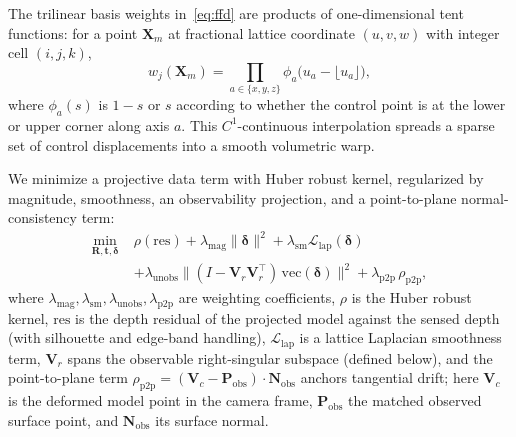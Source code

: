 \documentclass[9pt,twoside,web]{ieeecolor2}
\begin{document}
The trilinear basis weights in~\eqref{eq:ffd} are products of one-dimensional tent functions: for a point $\mathbf{X}_{m}$ at fractional lattice coordinate $(u,v,w)$ with integer cell $(i,j,k)$,
\begin{equation}\label{eq:trilinear}
w_{j}(\mathbf{X}_{m}) = \prod_{a\in\{x,y,z\}}\phi_{a}\!\bigl(u_{a}-\lfloor u_{a}\rfloor\bigr),
\end{equation}
where $\phi_{a}(s)$ is $1-s$ or $s$ according to whether the control point is at the lower or upper corner along axis $a$. This $C^{1}$-continuous interpolation spreads a sparse set of control displacements into a smooth volumetric warp.

We minimize a projective data term with Huber robust kernel, regularized by magnitude, smoothness, an observability projection, and a point-to-plane normal-consistency term:
\begin{equation}\label{eq:rtwobj}
\begin{aligned}
\min_{\mathbf{R},\mathbf{t},\boldsymbol{\delta}}\; & \rho\!\left(\mathrm{res}\right) + \lambda_{\mathrm{mag}}\|\boldsymbol{\delta}\|^{2} + \lambda_{\mathrm{sm}}\mathcal{L}_{\mathrm{lap}}(\boldsymbol{\delta}) \\
& + \lambda_{\mathrm{unobs}}\bigl\|(I-\mathbf{V}_{r}\mathbf{V}_{r}^{\top})\,\mathrm{vec}(\boldsymbol{\delta})\bigr\|^{2} + \lambda_{\mathrm{p2p}}\,\rho_{\mathrm{p2p}},
\end{aligned}
\end{equation}
where $\lambda_{\mathrm{mag}},\lambda_{\mathrm{sm}},\lambda_{\mathrm{unobs}},\lambda_{\mathrm{p2p}}$ are weighting coefficients, $\rho$ is the Huber robust kernel, $\mathrm{res}$ is the depth residual of the projected model against the sensed depth (with silhouette and edge-band handling), $\mathcal{L}_{\mathrm{lap}}$ is a lattice Laplacian smoothness term, $\mathbf{V}_{r}$ spans the observable right-singular subspace (defined below), and the point-to-plane term $\rho_{\mathrm{p2p}}=(\mathbf{V}_{c}-\mathbf{P}_{\mathrm{obs}})\cdot\mathbf{N}_{\mathrm{obs}}$ anchors tangential drift; here $\mathbf{V}_{c}$ is the deformed model point in the camera frame, $\mathbf{P}_{\mathrm{obs}}$ the matched observed surface point, and $\mathbf{N}_{\mathrm{obs}}$ its surface normal.
\end{document}
